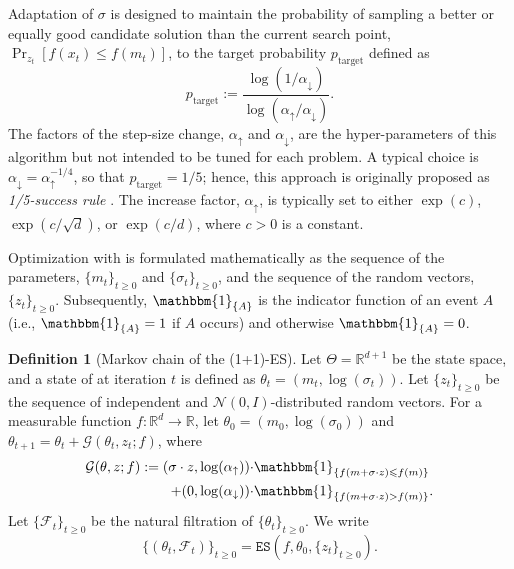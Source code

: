 \documentclass[journal]{IEEEtran}
\providecommand{\R}{\mathbb{R}} %
\providecommand{\ind}[1]{\ensuremath{\mathbbm{1}_{\left\{#1\right\}}}} %
\renewcommand{\geq}{\geqslant} %
\renewcommand{\leq}{\leqslant} %
\theoremstyle{definition}
\newtheorem{definition}[]{Definition}
\newcommand{\aup}{\alpha_{\uparrow}}
\newcommand{\adown}{\alpha_{\downarrow}}
\begin{document}
Adaptation of $\sigma$ is designed to maintain the probability of sampling a better or equally good candidate solution than the current search point, $\Pr_{z_t}[f(x_t) \leq f(m_t)]$, to the target probability $p_\mathrm{target}$ defined as
\begin{equation}
p_\mathrm{target} := \frac{\log(1/\adown)}{\log(\aup / \adown)} 
\label{eq:p_target-def}
.
\end{equation}
The factors of the step-size change, $\aup$ and $\adown$, are the hyper-parameters of this algorithm but not intended to be tuned for each problem. A typical choice is $\adown = \aup^{-1/4}$, so that $p_\mathrm{target} = 1/5$; hence, this approach is originally proposed as \emph{1/5-success rule} \cite{rechenberg1973evolution,kern2004learning}. The increase factor, $\aup$, is typically set to either $\exp(c)$, $\exp(c/\sqrt{d})$, or $\exp(c/d)$, where $c > 0$ is a constant.

Optimization with  is formulated mathematically as the sequence of the parameters, $\{m_t\}_{t\geq 0}$ and $\{\sigma_t\}_{t\geq 0}$, and the sequence of the random vectors, $\{z_t\}_{t\geq 0}$.
Subsequently, $\ind{A}$ is the indicator function of an event $A$ (i.e., $\ind{A} = 1$ if $A$ occurs) and otherwise $\ind{A} = 0$.
\begin{definition}[Markov chain of the (1+1)-ES]\label{def:algorithm}
Let $\Theta = \R^{d+1}$ be the state space, and a state of  at iteration $t$ is defined as $\theta_t = (m_t, \log(\sigma_t))$.
Let $\{z_t\}_{t \geq 0}$ be the sequence of independent and $\mathcal{N}(0, I)$-distributed random vectors.
For a measurable function $f : \R^d \to \R$, let $\theta_0 = (m_0, \log(\sigma_0))$ and $\theta_{t+1} = \theta_{t} + \mathcal{G}(\theta_t, z_t; f)$, where
\begin{equation}
\begin{split}
\mathcal{G}(\theta, z; f) := (\sigma \cdot z, \log(\aup)) \cdot &\ind{f(m + \sigma \cdot z) \leq f(m)}\\
+ (0, \log(\adown)) \cdot &\ind{f(m + \sigma \cdot z) > f(m)} .
\end{split}
\end{equation}
Let $\{\mathcal{F}_t\}_{t \geq 0}$ be the natural filtration of $\{\theta_t\}_{t \geq 0}$.
We write
\begin{equation}
\{(\theta_t, \mathcal{F}_{t})\}_{t\geq 0} = \texttt{ES}(f, \theta_0, \{z_t\}_{t \geq 0}) .
\end{equation}
\end{definition}
\end{document}
